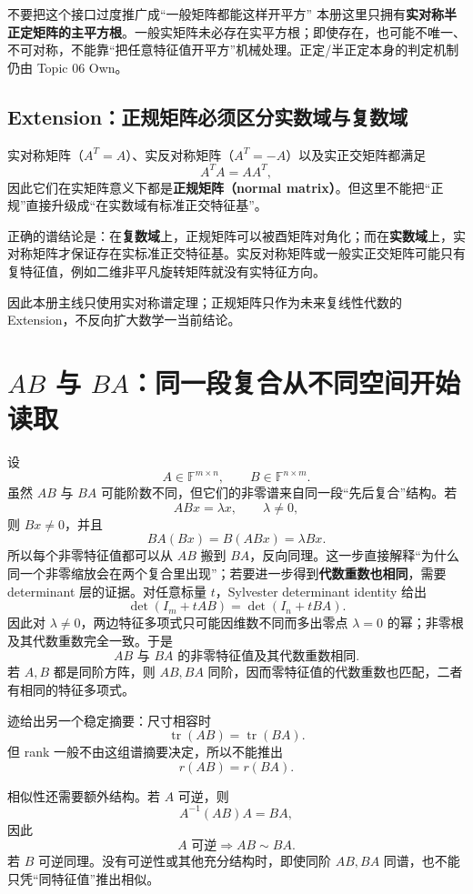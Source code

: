 \documentclass[11pt,a4paper]{ctexart}
\newcommand{\kw}[1]{\textbf{\color{deep}#1}}
\begin{document}
\begin{warnbox}{不要把这个接口过度推广成“一般矩阵都能这样开平方”}
本册这里只拥有\kw{实对称半正定矩阵的主平方根}。一般实矩阵未必存在实平方根；即使存在，也可能不唯一、不可对称，不能靠“把任意特征值开平方”机械处理。正定/半正定本身的判定机制仍由 Topic 06 Own。
\end{warnbox}

\subsection{Extension：正规矩阵必须区分实数域与复数域}
实对称矩阵（$A^T=A$）、实反对称矩阵（$A^T=-A$）以及实正交矩阵都满足
\[
A^TA=AA^T,
\]
因此它们在实矩阵意义下都是\kw{正规矩阵（normal matrix）}。但这里不能把“正规”直接升级成“在实数域有标准正交特征基”。

正确的谱结论是：在\kw{复数域}上，正规矩阵可以被酉矩阵对角化；而在\kw{实数域}上，实对称矩阵才保证存在实标准正交特征基。实反对称矩阵或一般实正交矩阵可能只有复特征值，例如二维非平凡旋转矩阵就没有实特征方向。

因此本册主线只使用实对称谱定理；正规矩阵只作为未来复线性代数的 Extension，不反向扩大数学一当前结论。

\section{$AB$ 与 $BA$：同一段复合从不同空间开始读取}

设
\[
A\in\mathbb F^{m\times n},\qquad B\in\mathbb F^{n\times m}.
\]
虽然 $AB$ 与 $BA$ 可能阶数不同，但它们的非零谱来自同一段“先后复合”结构。若
\[
ABx=\lambda x,\qquad \lambda\neq0,
\]
则 $Bx\neq0$，并且
\[
BA(Bx)=B(ABx)=\lambda Bx.
\]
所以每个非零特征值都可以从 $AB$ 搬到 $BA$，反向同理。这一步直接解释“为什么同一个非零缩放会在两个复合里出现”；若要进一步得到\kw{代数重数也相同}，需要 determinant 层的证据。对任意标量 $t$，Sylvester determinant identity 给出
\[
\boxed{\det(I_m+tAB)=\det(I_n+tBA).}
\]
因此对 $\lambda\neq0$，两边特征多项式只可能因维数不同而多出零点 $\lambda=0$ 的幂；非零根及其代数重数完全一致。于是
\[
\boxed{AB\text{ 与 }BA\text{ 的非零特征值及其代数重数相同}.}
\]
若 $A,B$ 都是同阶方阵，则 $AB,BA$ 同阶，因而零特征值的代数重数也匹配，二者有相同的特征多项式。

迹给出另一个稳定摘要：尺寸相容时
\[
\boxed{\operatorname{tr}(AB)=\operatorname{tr}(BA).}
\]
但 rank 一般不由这组谱摘要决定，所以不能推出
\[
r(AB)=r(BA).
\]

相似性还需要额外结构。若 $A$ 可逆，则
\[
A^{-1}(AB)A=BA,
\]
因此
\[
\boxed{A\text{ 可逆}\Longrightarrow AB\sim BA.}
\]
若 $B$ 可逆同理。没有可逆性或其他充分结构时，即使同阶 $AB,BA$ 同谱，也不能只凭“同特征值”推出相似。
\end{document}
